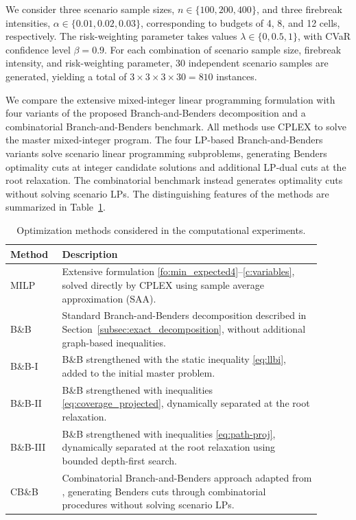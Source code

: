 \documentclass[a4paper,fleqn]{cas-sc}
\begin{document}
We consider three scenario sample sizes, $n\in\{100,200,400\}$, and
three firebreak intensities, $\alpha\in\{0.01,0.02,0.03\}$, corresponding
to budgets of 4, 8, and 12 cells, respectively. The risk-weighting
parameter takes values $\lambda\in\{0,0.5,1\}$, with CVaR confidence
level $\beta=0.9$. For each combination of scenario sample size, firebreak intensity, and risk-weighting parameter, 30 independent scenario samples are generated, yielding a total of $3\times3\times3\times30=810$ instances.

We compare the extensive mixed-integer linear programming formulation
with four variants of the proposed Branch-and-Benders decomposition and
a combinatorial Branch-and-Benders benchmark. All methods use CPLEX to solve the master mixed-integer
program. The four LP-based Branch-and-Benders variants
solve scenario linear programming subproblems, generating
Benders optimality cuts at integer candidate solutions
and additional LP-dual cuts at the root relaxation.
The combinatorial benchmark instead generates optimality
cuts without solving scenario LPs. The distinguishing
features of the methods are summarized in
Table~\ref{tab:methods}.

\begin{table}[t]
\centering
\normalfont
\caption{Optimization methods considered in the computational experiments.}
\label{tab:methods}
\begin{tabular}{p{0.14\linewidth}p{0.76\linewidth}}
\toprule
Method & Description \\
\midrule
MILP &
Extensive formulation
\eqref{fo:min_expected4}--\eqref{c:variables},
solved directly by CPLEX using sample average approximation (SAA).
\\

B\&B &
Standard Branch-and-Benders decomposition described in
Section~\ref{subsec:exact_decomposition}, without additional graph-based inequalities.
\\

B\&B-I &
B\&B strengthened with the static inequality \eqref{eq:llbi},
added to the initial master problem.
\\

B\&B-II &
B\&B strengthened with inequalities \eqref{eq:coverage_projected},
dynamically separated at the root relaxation.
\\

B\&B-III &
B\&B strengthened with inequalities \eqref{eq:path-proj},
dynamically separated at the root relaxation using bounded
depth-first search.
\\

CB\&B &
Combinatorial Branch-and-Benders approach adapted from
\citet{taninmics2024benders}, generating Benders cuts through
combinatorial procedures without solving scenario LPs.
\\
\bottomrule
\end{tabular}
\end{table}
\end{document}
